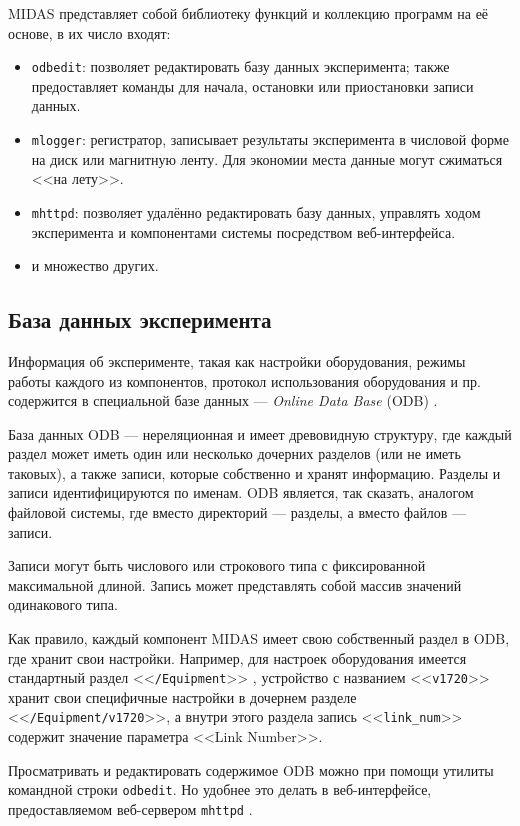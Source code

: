\documentclass[12pt, a4paper, oneside, onecolumn]{book}
\newcommand{\MIDAS}{\mbox{MIDAS}}
\newcommand{\APP}[1]{\mbox{\tt #1}}
\newcommand{\TERM}[1]{{\it #1}}
\newcommand{\ODBNODE}[1]{<<{\tt #1}>>}
\begin{document}
\MIDAS{} представляет собой библиотеку функций и коллекцию программ на её основе, в их число входят:

\begin{itemize}
\item \APP{odbedit}: позволяет редактировать базу данных эксперимента; также предоставляет команды для начала, остановки или приостановки записи данных.
\item \APP{mlogger}: регистратор, записывает результаты эксперимента в числовой форме на диск или магнитную ленту. Для экономии места данные могут сжиматься <<на лету>>.
\item \APP{mhttpd}: позволяет удалённо редактировать базу данных, управлять ходом эксперимента и компонентами системы посредством веб-интерфейса.
\item и множество других.
\end{itemize}

\subsection{База данных эксперимента}

Информация об эксперименте, такая как настройки оборудования, режимы работы каждого из компонентов, протокол использования оборудования и пр. содержится в специальной базе данных --- \TERM{Online Data Base} (ODB) \cite{MidasWikiODB}.

База данных ODB --- нереляционная и имеет древовидную структуру, где каждый раздел может иметь один или несколько дочерних разделов (или не иметь таковых), а также записи, которые собственно и хранят информацию. Разделы и записи идентифицируются по именам. ODB является, так сказать, аналогом файловой системы, где вместо директорий --- разделы, а вместо файлов --- записи.

Записи могут быть числового или строкового типа с фиксированной максимальной длиной. Запись может представлять собой массив значений одинакового типа.

Как правило, каждый компонент \MIDAS{} имеет свою собственный раздел в ODB, где хранит свои настройки. Например, для настроек оборудования имеется стандартный  раздел \ODBNODE{/Equipment} \cite{MidasWikiEquipment}, устройство с названием \ODBNODE{v1720} хранит свои специфичные настройки в дочернем разделе \ODBNODE{/Equipment/v1720}, а внутри этого раздела запись \ODBNODE{link\_num} содержит значение параметра <<Link Number>>.

Просматривать и редактировать содержимое ODB можно при помощи утилиты командной строки \APP{odbedit}. Но удобнее это делать в веб-интерфейсе, предоставляемом веб-сервером \APP{mhttpd} \cite{MidasWikiMhttpd}.
\end{document}
